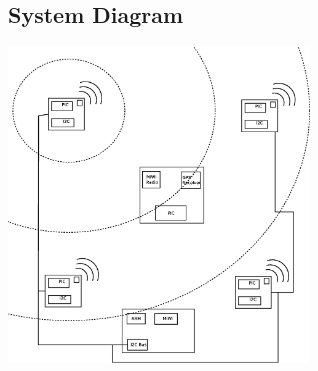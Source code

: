 \documentclass{article}
\begin{document}
\subsection*{System Diagram}
\includegraphics[width=0.6\textwidth]{system}
\end{document}
